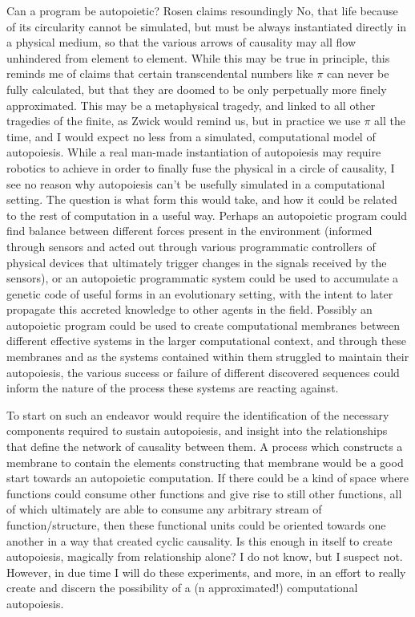 \documentclass[12pt]{scrartcl}
\begin{document}
Can a program be autopoietic?  Rosen claims resoundingly No, that life because of its circularity cannot be simulated, but must be always instantiated directly in a physical medium, so that the various arrows of causality may all flow unhindered from element to element.  While this may be true in principle, this reminds me of claims that certain transcendental numbers like $\pi$ can never be fully calculated, but that they are doomed to be only perpetually more finely approximated.  This may be a metaphysical tragedy, and linked to all other tragedies of the finite, as Zwick would remind us,\cite{Zwick} but in practice we use $\pi$ all the time, and I would expect no less from a simulated, computational model of autopoiesis.  While a real man-made instantiation of autopoiesis may require robotics to achieve in order to finally fuse the physical in a circle of causality, I see no reason why autopoiesis can't be usefully simulated in a computational setting.  The question is what form this would take, and how it could be related to the rest of computation in a useful way.  Perhaps an autopoietic program could find balance between different forces present in the environment (informed through sensors and acted out through various programmatic controllers of physical devices that ultimately trigger changes in the signals received by the sensors), or an autopoietic programmatic system could be used to accumulate a genetic code of useful forms in an evolutionary setting, with the intent to later propagate this accreted knowledge to other agents in the field.  Possibly an autopoietic program could be used to create computational membranes between different effective systems in the larger computational context, and through these membranes and as the systems contained within them struggled to maintain their autopoiesis, the various success or failure of different discovered sequences could inform the nature of the process these systems are reacting against.  

To start on such an endeavor would require the identification of the necessary components required to sustain autopoiesis, and insight into the relationships that define the network of causality between them. A process which constructs a membrane to contain the elements constructing that membrane would be a good start towards an autopoietic computation.  If there could be a kind of space where functions could consume other functions and give rise to still other functions, all of which ultimately are able to consume any arbitrary stream of function/structure, then these functional units could be oriented towards one another in a way that created cyclic causality.  Is this enough in itself to create autopoiesis, magically from relationship alone?  I do not know, but I suspect not.  However, in due time I will do these experiments, and more, in an effort to really create and discern the possibility of a (n approximated!) computational autopoiesis.
\end{document}

